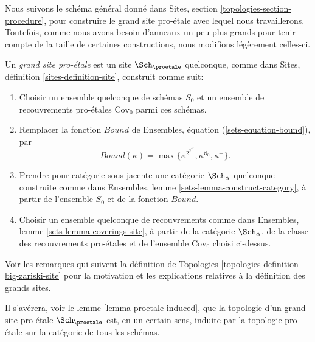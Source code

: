 \noindent
Nous suivons le schéma général donné dans
Sites, section \ref{topologies-section-procedure},
pour construire le grand site pro-\'etale avec lequel nous travaillerons.
Toutefois, comme nous avons besoin d'anneaux un peu plus grands pour tenir compte de la taille
de certaines constructions, nous modifions légèrement celles-ci.

\begin{definition}
\label{definition-big-proetale-site}
Un {\it grand site pro-\'etale} est un site $\Sch_\proetale$ quelconque, comme dans
Sites, définition \ref{sites-definition-site}, construit comme suit:
\begin{enumerate}
\item Choisir un ensemble quelconque de schémas $S_0$ et un ensemble de recouvrements pro-\'etales
$\text{Cov}_0$ parmi ces schémas.
\item Remplacer la fonction $Bound$ de
Ensembles, équation (\ref{sets-equation-bound}), par
$$
Bound(\kappa) = \max\{\kappa^{2^{2^{2^\kappa}}}, \kappa^{\aleph_0}, \kappa^+\}.
$$
\item Prendre pour catégorie sous-jacente une catégorie $\Sch_\alpha$ quelconque
construite comme dans Ensembles, lemme \ref{sets-lemma-construct-category},
à partir de l'ensemble $S_0$ et de la fonction $Bound$.
\item Choisir un ensemble quelconque de recouvrements comme dans
Ensembles, lemme \ref{sets-lemma-coverings-site}, à partir de la
catégorie $\Sch_\alpha$, de la classe des recouvrements pro-\'etales
et de l'ensemble $\text{Cov}_0$ choisi ci-dessus.
\end{enumerate}
\end{definition}

\noindent
Voir les remarques qui suivent la
définition de Topologies \ref{topologies-definition-big-zariski-site}
pour la motivation et les explications relatives à la définition des grands sites.

\medskip\noindent
Il s'avérera, voir le lemme \ref{lemma-proetale-induced}, que la
topologie d'un grand site pro-\'etale $\Sch_\proetale$ est, en un certain sens,
induite par la topologie pro-\'etale sur la catégorie de tous les schémas.

